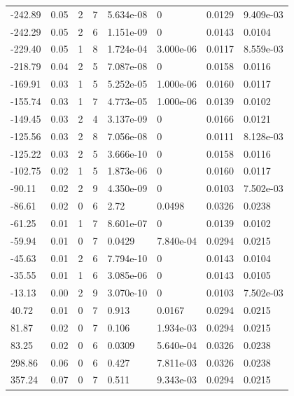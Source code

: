 \documentclass[preview]{standalone}
\begin{document}
{{\begin{tabular}{L{1.2cm}C{1.2cm} C{0.3cm}C{0.5cm} C{1.4cm}C{1.4cm} C{1.4cm}C{1.4cm}}
  -242.89  &  0.05  & 2     &  7 &  5.634e-08  & 0  & 0.0129 &  9.409e-03   \\ 
  -242.29  &  0.05  & 2     &  6 &  1.151e-09  & 0  & 0.0143 &  0.0104   \\ 
  -229.40  &  0.05  & 1     &  8 &  1.724e-04  & 3.000e-06  & 0.0117 &  8.559e-03   \\ 
  -218.79  &  0.04  & 2     &  5 &  7.087e-08  & 0  & 0.0158 &  0.0116   \\ 
  -169.91  &  0.03  & 1     &  5 &  5.252e-05  & 1.000e-06  & 0.0160 &  0.0117   \\ 
  -155.74  &  0.03  & 1     &  7 &  4.773e-05  & 1.000e-06  & 0.0139 &  0.0102   \\ 
  -149.45  &  0.03  & 2     &  4 &  3.137e-09  & 0  & 0.0166 &  0.0121   \\ 
  -125.56  &  0.03  & 2     &  8 &  7.056e-08  & 0  & 0.0111 &  8.128e-03   \\ 
  -125.22  &  0.03  & 2     &  5 &  3.666e-10  & 0  & 0.0158 &  0.0116   \\ 
  -102.75  &  0.02  & 1     &  5 &  1.873e-06  & 0  & 0.0160 &  0.0117   \\ 
  -90.11  &  0.02  & 2     &  9 &  4.350e-09  & 0  & 0.0103 &  7.502e-03   \\ 
  -86.61  &  0.02  & 0     &  6 &  2.72  & 0.0498  & 0.0326 &  0.0238   \\ 
  -61.25  &  0.01  & 1     &  7 &  8.601e-07  & 0  & 0.0139 &  0.0102   \\ 
  -59.94  &  0.01  & 0     &  7 &  0.0429  & 7.840e-04  & 0.0294 &  0.0215   \\ 
  -45.63  &  0.01  & 2     &  6 &  7.794e-10  & 0  & 0.0143 &  0.0104   \\ 
  -35.55  &  0.01  & 1     &  6 &  3.085e-06  & 0  & 0.0143 &  0.0105   \\ 
  -13.13  &  0.00  & 2     &  9 &  3.070e-10  & 0  & 0.0103 &  7.502e-03   \\ 
  40.72  &  0.01  & 0     &  7 &  0.913  & 0.0167  & 0.0294 &  0.0215   \\ 
  81.87  &  0.02  & 0     &  7 &  0.106  & 1.934e-03  & 0.0294 &  0.0215   \\ 
  83.25  &  0.02  & 0     &  6 &  0.0309  & 5.640e-04  & 0.0326 &  0.0238   \\ 
  298.86  &  0.06  & 0     &  6 &  0.427  & 7.811e-03  & 0.0326 &  0.0238   \\ 
  357.24  &  0.07  & 0     &  7 &  0.511  & 9.343e-03  & 0.0294 &  0.0215   \\ 

\end{tabular}}}
\end{document}
